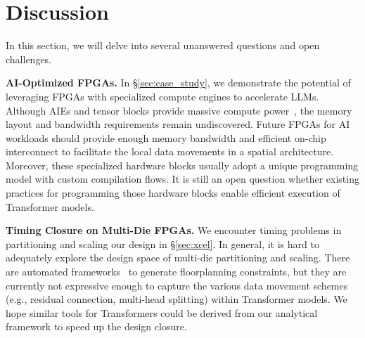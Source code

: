 \section{Discussion}
\label{sec:discussion}
In this section, we will delve into several unanswered questions and open challenges.

\noindent\textbf{AI-Optimized FPGAs.} 
In \S\ref{sec:case_study}, we demonstrate the potential of leveraging FPGAs with specialized compute engines to accelerate LLMs.
Although AIEs and tensor blocks provide massive compute power~\cite{xilinxAIE,stratix10}, the memory layout and bandwidth requirements remain undiscovered. 
Future FPGAs for AI workloads should provide enough memory bandwidth and efficient on-chip interconnect to facilitate the local data movements in a spatial architecture.
Moreover, these specialized hardware blocks usually adopt a unique programming model with custom compilation flows.
It is still an open question whether existing practices for programming those hardware blocks enable efficient execution of Transformer models.


\noindent\textbf{Timing Closure on Multi-Die FPGAs.} 
We encounter timing problems in partitioning and scaling our design in \S\ref{sec:xcel}. 
In general, it is hard to adequately explore the design space of multi-die partitioning and scaling. 
There are automated frameworks~\cite{guo2021autobridge,moazin2023pasta} to generate floorplanning constraints, but they are currently not expressive enough to capture the various data movement schemes (e.g., residual connection, multi-head splitting) within Transformer models.
We hope similar tools for Transformers could be derived from our analytical framework to speed up the design closure. %


